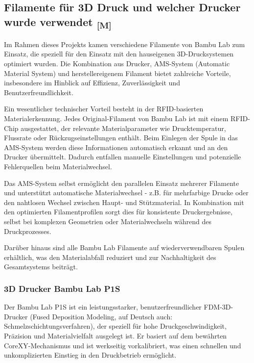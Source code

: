 \documentclass[a4paper,12pt]{article}
\begin{document}
\newpage

\subsection{\texorpdfstring{Filamente für 3D Druck und welcher Drucker wurde verwendet \textsubscript{[M]}}{Filamente für 3D Druck und welcher Drucker wurde verwendet [M]}}

Im Rahmen dieses Projekts kamen verschiedene Filamente von Bambu Lab zum Einsatz, die speziell für den Einsatz mit den hauseigenen 3D-Drucksystemen optimiert wurden. Die Kombination aus Drucker, AMS-System (Automatic Material System) und herstellereigenem Filament bietet zahlreiche Vorteile, insbesondere im Hinblick auf Effizienz, Zuverlässigkeit und Benutzerfreundlichkeit.

Ein wesentlicher technischer Vorteil besteht in der RFID-basierten Materialerkennung. Jedes Original-Filament von Bambu Lab ist mit einem RFID-Chip ausgestattet, der relevante Materialparameter wie Drucktemperatur, Flussrate oder Rückzugseinstellungen enthält. Beim Einlegen der Spule in das AMS-System werden diese Informationen automatisch erkannt und an den Drucker übermittelt. Dadurch entfallen manuelle Einstellungen und potenzielle Fehlerquellen beim Materialwechsel.

Das AMS-System selbst ermöglicht den parallelen Einsatz mehrerer Filamente und unterstützt automatische Materialwechsel - z.B. für mehrfarbige Drucke oder den nahtlosen Wechsel zwischen Haupt- und Stützmaterial. In Kombination mit den optimierten Filamentprofilen sorgt dies für konsistente Druckergebnisse, selbst bei komplexen Geometrien oder Materialwechseln während des Druckprozesses.

Darüber hinaus sind alle Bambu Lab Filamente auf wiederverwendbaren Spulen erhältlich, was den Materialabfall reduziert und zur Nachhaltigkeit des Gesamtsystems beiträgt.\newline

\subsubsection{3D Drucker Bambu Lab P1S}

Der Bambu Lab P1S ist ein leistungsstarker, benutzerfreundlicher FDM-3D-Drucker (Fused Deposition Modeling, auf Deutsch auch: Schmelzschichtungsverfahren), der speziell für hohe Druckgeschwindigkeit, Präzision und Materialvielfalt ausgelegt ist. Er basiert auf dem bewährten CoreXY-Mechanismus und ist werkseitig vorkalibriert, was einen schnellen und unkomplizierten Einstieg in den Druckbetrieb ermöglicht.
\end{document}
